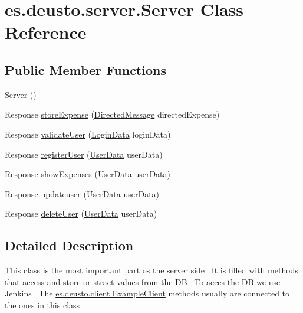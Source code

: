 \hypertarget{classes_1_1deusto_1_1server_1_1_server}{}\section{es.\+deusto.\+server.\+Server Class Reference}
\label{classes_1_1deusto_1_1server_1_1_server}
\subsection*{Public Member Functions}
\begin{DoxyCompactItemize}
\item 
\hyperlink{classes_1_1deusto_1_1server_1_1_server_a84f78162a65dd737f224eb2f94c43023}{Server} ()
\item 
Response \hyperlink{classes_1_1deusto_1_1server_1_1_server_a1a91c5bde8d3b39fc4292dc09d62b61b}{store\+Expense} (\hyperlink{classes_1_1deusto_1_1serialization_1_1_directed_message}{Directed\+Message} directed\+Expense)
\item 
Response \hyperlink{classes_1_1deusto_1_1server_1_1_server_a6e5f5013058ddaf970b0b21da2e32f66}{validate\+User} (\hyperlink{classes_1_1deusto_1_1serialization_1_1_login_data}{Login\+Data} login\+Data)
\item 
Response \hyperlink{classes_1_1deusto_1_1server_1_1_server_a12f56d7a970c3c41fefe8ed2db835c0a}{register\+User} (\hyperlink{classes_1_1deusto_1_1serialization_1_1_user_data}{User\+Data} user\+Data)
\item 
Response \hyperlink{classes_1_1deusto_1_1server_1_1_server_aa28b04cc2643cf60072fc2a680288cde}{show\+Expenses} (\hyperlink{classes_1_1deusto_1_1serialization_1_1_user_data}{User\+Data} user\+Data)
\item 
Response \hyperlink{classes_1_1deusto_1_1server_1_1_server_aae24e983f2b93173ee25d366a522a936}{updateuser} (\hyperlink{classes_1_1deusto_1_1serialization_1_1_user_data}{User\+Data} user\+Data)
\item 
Response \hyperlink{classes_1_1deusto_1_1server_1_1_server_a97535594f4d5406d52e93e093cf6c5bd}{delete\+User} (\hyperlink{classes_1_1deusto_1_1serialization_1_1_user_data}{User\+Data} user\+Data)
\end{DoxyCompactItemize}


\subsection{Detailed Description}
This class is the most important part os the server side~\newline
 It is filled with methods that access and store or stract values from the DB~\newline
 To acces the DB we use Jenkins~\newline
 The \hyperlink{classes_1_1deusto_1_1client_1_1_example_client}{es.\+deusto.\+client.\+Example\+Client} methods usually are connected to the ones in this class 

